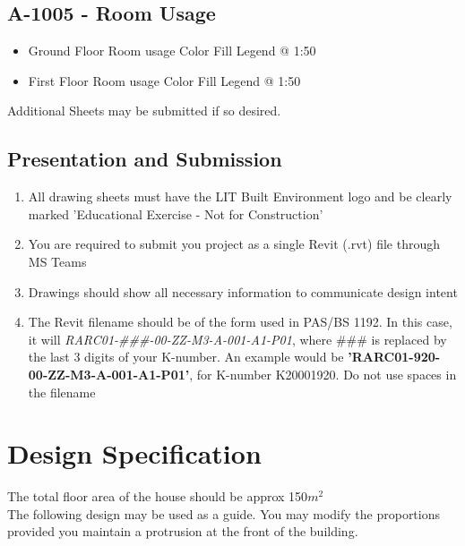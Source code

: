 \subsection*{A-1005 - Room Usage}
\begin{itemize}
	\item Ground Floor Room usage Color Fill Legend @ 1:50
	\item First Floor Room usage Color Fill Legend @ 1:50
\end{itemize}


Additional Sheets may be submitted if so desired.


\begin{flushleft}
\section*{Presentation and Submission}
\end{flushleft}


\begin{enumerate}
	\item All drawing sheets must have the LIT Built Environment logo and be clearly marked 'Educational Exercise - Not for Construction'
	\item You are required to submit you project as a single Revit (.rvt) file through MS Teams
	\item Drawings should show all necessary information to communicate design intent
	\item The Revit filename should be of the form used in PAS/BS 1192.  In this case, it will \textit{RARC01-\#\#\#-00-ZZ-M3-A-001-A1-P01}, where \#\#\# is replaced by the last 3 digits of your K-number. An example would be \textbf{'RARC01-920-00-ZZ-M3-A-001-A1-P01'}, for K-number K20001920.  Do not use spaces in the filename
\end{enumerate}


\newpage

\section*{Design Specification}



The total floor area of the house should be approx 150$m^2$\\

The following design may be used as a guide.  You may modify the proportions provided you maintain a protrusion at the front of the building.


